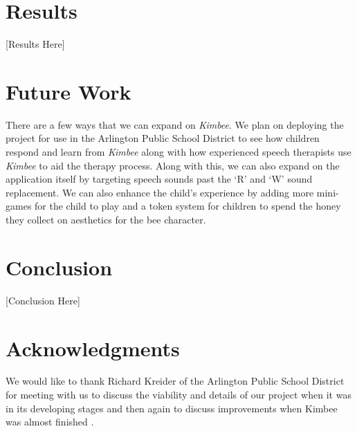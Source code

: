 \documentclass{sig-alternate-2013}
\begin{document}
\section{Results}

[Results Here]

\section{Future Work}

There are a few ways that we can expand on {\em Kimbee}. We plan on deploying the project for use in the Arlington Public School District to see how children respond and learn from {\em Kimbee} along with how experienced speech therapists use {\em Kimbee} to aid the therapy process. Along with this, we can also expand on the application itself by targeting speech sounds past the `R' and `W' sound replacement. We can also enhance the child's experience by adding more mini-games for the child to play and a token system for children to spend the honey they collect on aesthetics for the bee character.

\section{Conclusion}

[Conclusion Here]

\section{Acknowledgments}

We would like to thank Richard Kreider of the Arlington Public School District for meeting with us to discuss the viability and details of our project when it was in its developing stages and then again to discuss improvements when Kimbee was almost finished \cite{Kreider:Intro,Kreider:Results}.




\balancecolumns
\end{document}
